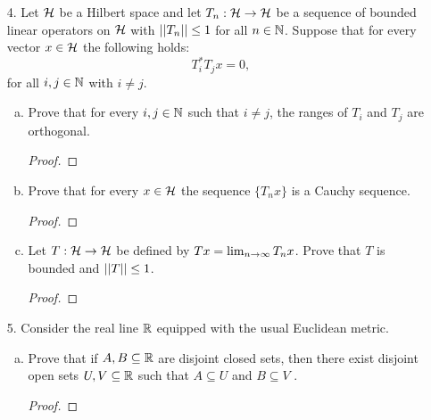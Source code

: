 \begin{itemize}
\begin{enumerate}[(a)]
\begin{proof}
    \end{proof}

    \item Let $T$ be a bounded linear operator on $\calh$. If $\{f_n\}_{n=1}^{\infty} \subseteq \calh$ converges weakly to $f \in \calh$, then $\{Tf_n\}_{n=1}^{\infty}$ converges weakly to $Tf$.
    \begin{proof}

    \end{proof}
\end{enumerate}






\item[4.] Let $\calh$ be a Hilbert space and let $T_n : \mathcal{H} \rightarrow \mathcal{H}$ be a sequence of bounded linear operators on $\calh$ with $\left|\left|{}T_n\right|\right| \leq 1$ for all $n \in \mathbb{N}$. Suppose that for every vector $x \in \mathcal{H}$ the following holds:
$$T_i^* T_j x = 0,$$
for all $i, j \in \mathbb{N}$ with $i \neq j$.
\begin{enumerate}[(a)]
    \item Prove that for every $i, j \in \mathbb{N}$ such that $i \neq j$, the ranges of $T_i$ and $T_j$ are orthogonal.
    \begin{proof}

    \end{proof}

    \item Prove that for every $x \in \mathcal{H}$ the sequence $\{T_n x\}$ is a Cauchy sequence.
    \begin{proof}

    \end{proof}
    
    \item Let $T : \mathcal{H} \rightarrow \mathcal{H}$ be defined by $Tx = \lim_{n \rightarrow \infty} T_n x$. Prove that $T$ is bounded and $\left|\left|{}T\right|\right| \leq 1$.
    \begin{proof}

    \end{proof}
\end{enumerate}








\item[5.] Consider the real line $\mathbb{R}$ equipped with the usual Euclidean metric.
\begin{enumerate}[(a)]
    \item Prove that if $A, B \subseteq \mathbb{R}$ are disjoint closed sets, then there exist disjoint open
sets $U, V \subseteq \mathbb{R}$ such that $A \subseteq U$ and $B \subseteq V$ .
    \begin{proof}


\end{proof}
\end{enumerate}
\end{itemize}
